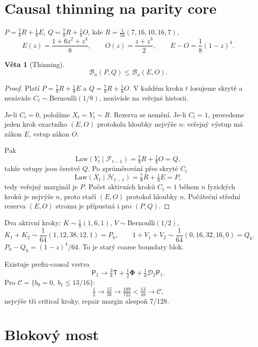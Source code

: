 \documentclass[11pt,a4paper]{article}
\newtheorem{theorem}{Věta}
\theoremstyle{definition}
\theoremstyle{remark}
\theoremstyle{plain}
\begin{document}
\section{Causal thinning na parity core}

$P=\frac78 R+\frac18 E$, $Q=\frac78 R+\frac18 O$, kde
$R=\frac1{56}(7,16,10,16,7)$,
\[
E(z)=\frac{1+6z^2+z^4}{8},\qquad
O(z)=\frac{z+z^3}{2},\qquad
E-O=\frac18(1-z)^4.
\]

\begin{theorem}[Thinning]
\[
\mathcal B_n(P,Q)\le\mathcal B_n(E,O).
\tag{D}
\]
\end{theorem}

\begin{proof}
Platí $P=\frac78 R+\frac18 E$ a $Q=\frac78 R+\frac18 O$.
V každém kroku $t$ losujeme skrytě a nezávisle $C_t\sim\mathrm{Bernoulli}(1/8)$,
nezávisle na veřejné historii.

Je-li $C_t=0$, položíme $X_t=Y_t\sim R$. Rezerva se nemění.
Je-li $C_t=1$, provedeme jeden krok exactního $(E,O)$ protokolu hloubky
nejvýše $n$: veřejný výstup má zákon $E$, vstup zákon $O$.

Pak
\[
\mathrm{Law}(Y_t\mid\mathcal F_{t-1})
=\tfrac78 R+\tfrac18 O=Q,
\]
takže vstupy jsou čerstvé $Q$. Po zprůměrování přes skryté $C_t$
\[
\mathrm{Law}(X_t\mid\mathcal H_{t-1})
=\tfrac78 R+\tfrac18 E=P,
\]
tedy veřejný marginál je $P$. Počet aktivních kroků $C_t=1$ během $n$
fyzických kroků je nejvýše $n$, proto stačí $(E,O)$ protokol hloubky $n$.
Počáteční střední rezerva $(E,O)$ stromu je přípustná i pro $(P,Q)$.
\end{proof}

Dva aktivní kroky: $K\sim\frac18(1,6,1)$, $V\sim\mathrm{Bernoulli}(1/2)$,
\[
K_1+K_2\sim\frac1{64}(1,12,38,12,1)=P_{\mathrm b},\qquad
1+V_1+V_2\sim\frac1{64}(0,16,32,16,0)=Q_{\mathrm b}.
\]
$P_{\mathrm b}-Q_{\mathrm b}=(1-z)^4/64$. To je starý coarse boundary blok.

Existuje prefix-causal vrstva
\[
\mathsf P_1\longrightarrow
\tfrac38\mathsf T+\tfrac12\boldsymbol\Phi+\tfrac18\mathscr D_2\mathsf P_1.
\tag{E}
\]
Pro $\mathcal C=\{b_0=0,\ b_1\le 13/16\}$:
\[
\tfrac12\longrightarrow\tfrac{15}{38}\longrightarrow\tfrac{189}{722}
<\tfrac{13}{48}\longrightarrow\mathcal C,
\]
nejvýše tři critical kroky, repair margin alespoň $7/128$.

\section{Blokový most}
\end{document}
